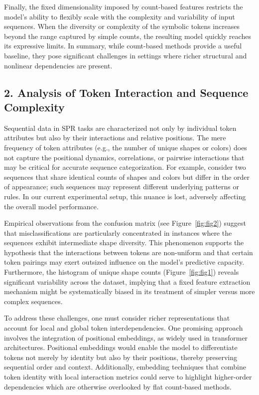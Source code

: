 \documentclass{article}
\begin{document}
Finally, the fixed dimensionality imposed by count-based features restricts the model’s ability to flexibly scale with the complexity and variability of input sequences. When the diversity or complexity of the symbolic tokens increases beyond the range captured by simple counts, the resulting model quickly reaches its expressive limits. In summary, while count-based methods provide a useful baseline, they pose significant challenges in settings where richer structural and nonlinear dependencies are present.

\subsection*{2. Analysis of Token Interaction and Sequence Complexity}
Sequential data in SPR tasks are characterized not only by individual token attributes but also by their interactions and relative positions. The mere frequency of token attributes (e.g., the number of unique shapes or colors) does not capture the positional dynamics, correlations, or pairwise interactions that may be critical for accurate sequence categorization. For example, consider two sequences that share identical counts of shapes and colors but differ in the order of appearance; such sequences may represent different underlying patterns or rules. In our current experimental setup, this nuance is lost, adversely affecting the overall model performance.

Empirical observations from the confusion matrix (see Figure~\ref{fig:fig2}) suggest that misclassifications are particularly concentrated in instances where the sequences exhibit intermediate shape diversity. This phenomenon supports the hypothesis that the interactions between tokens are non-uniform and that certain token pairings may exert outsized influence on the model’s predictive capacity. Furthermore, the histogram of unique shape counts (Figure~\ref{fig:fig1}) reveals significant variability across the dataset, implying that a fixed feature extraction mechanism might be systematically biased in its treatment of simpler versus more complex sequences.

To address these challenges, one must consider richer representations that account for local and global token interdependencies. One promising approach involves the integration of positional embeddings, as widely used in transformer architectures. Positional embeddings would enable the model to differentiate tokens not merely by identity but also by their positions, thereby preserving sequential order and context. Additionally, embedding techniques that combine token identity with local interaction metrics could serve to highlight higher-order dependencies which are otherwise overlooked by flat count-based methods.
\end{document}
